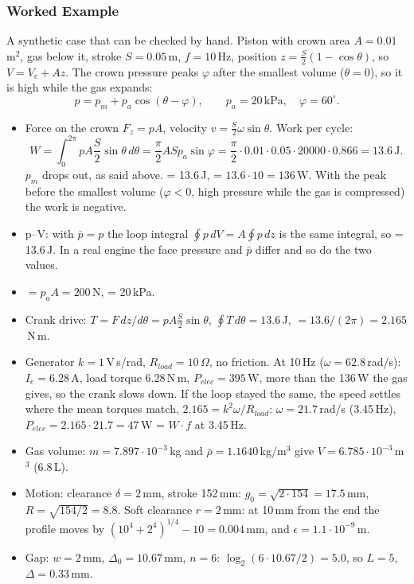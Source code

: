 \subsubsection{Worked Example}
A synthetic case that can be checked by hand. Piston with crown area $A = 0.01$\,m$^2$, gas below it, stroke $S = 0.05$\,m, $f = 10$\,Hz, position $z = \frac{S}{2}(1 - \cos\theta)$, so $V = V_c + A z$. The crown pressure peaks $\varphi$ after the smallest volume ($\theta = 0$), so it is high while the gas expands:
\begin{equation}
p = p_m + p_a \cos(\theta - \varphi), \qquad p_a = 20\,\textrm{kPa}, \quad \varphi = 60^\circ .
\end{equation}
\begin{itemize}
    \item Force on the crown $F_z = p A$, velocity $v = \frac{S}{2}\omega\sin\theta$. Work per cycle:
    \begin{equation}
    W = \int_0^{2\pi} p A \frac{S}{2}\sin\theta\, d\theta = \frac{\pi}{2} A S p_a \sin\varphi = \frac{\pi}{2}\cdot 0.01 \cdot 0.05 \cdot 20000 \cdot 0.866 = 13.6\,\textrm{J}.
    \end{equation}
    $p_m$ drops out, as said above.  = 13.6\,J,  = $13.6 \cdot 10 = 136$\,W. With the peak before the smallest volume ($\varphi < 0$, high pressure while the gas is compressed) the work is negative.
    \item p--V: with $\bar{p} = p$ the loop integral $\oint p\,dV = A\oint p\,dz$ is the same integral, so  = 13.6\,J. In a real engine the face pressure and $\bar{p}$ differ and so do the two values.
    \item {} $= p_a A = 200$\,N,  = 20\,kPa.
    \item Crank drive: $T = F\,dz/d\theta = p A \frac{S}{2}\sin\theta$, $\oint T\,d\theta = 13.6$\,J,  $= 13.6/(2\pi) = 2.165$\,N\,m.
    \item Generator $k = 1$\,V\,s/rad, $R_{load} = 10\,\Omega$, no friction. At 10\,Hz ($\omega = 62.8$\,rad/s): $I_e = 6.28$\,A, load torque 6.28\,N\,m, $P_{elec} = 395$\,W, more than the 136\,W the gas gives, so the crank slows down. If the loop stayed the same, the speed settles where the mean torques match, $2.165 = k^2\omega/R_{load}$: $\omega = 21.7$\,rad/s (3.45\,Hz), $P_{elec} = 2.165 \cdot 21.7 = 47$\,W = $W \cdot f$ at 3.45\,Hz.
    \item Gas volume:  $m = 7.897\cdot10^{-3}$\,kg and  $\bar{\rho} = 1.1640$\,kg/m$^3$ give $V = 6.785\cdot10^{-3}$\,m$^3$ (6.8\,L).
    \item Motion: clearance $\delta = 2$\,mm, stroke 152\,mm: $g_0 = \sqrt{2 \cdot 154} = 17.5$\,mm, $R = \sqrt{154/2} = 8.8$. Soft clearance $r = 2$\,mm: at 10\,mm from the end the profile moves by $(10^4 + 2^4)^{1/4} - 10 = 0.004$\,mm, and $\epsilon = 1.1\cdot10^{-9}$\,m.
    \item Gap: $w = 2$\,mm, $\Delta_0 = 10.67$\,mm, $n = 6$: $\log_2(6 \cdot 10.67/2) = 5.0$, so $L = 5$, $\Delta = 0.33$\,mm.
\end{itemize}


